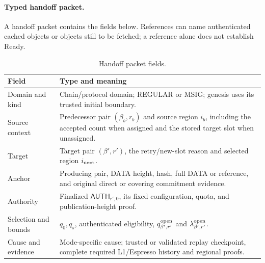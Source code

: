 \documentclass[11pt,a4paper]{article}
\newcommand{\tagg}[1]{\ensuremath{\mathsf{#1}}}
\newcounter{protocol}
\begin{document}
\paragraph{Typed handoff packet.}
A handoff packet contains the fields below. References can name
authenticated cached objects or objects still to be fetched; a reference
alone does not establish Ready.
\begin{table}[htbp]\centering\small
\caption{Handoff packet fields.}
\label{tab:handoff-packet}
\begin{tabularx}{\linewidth}{@{}>{\raggedright\arraybackslash}p{.26\linewidth}Y@{}}\toprule
Field & Type and meaning\\\midrule
Domain and kind & Chain/protocol domain; REGULAR or MSIG; genesis uses its trusted initial boundary.\\
Source context & Predecessor pair $(\beta_b,r_b)$ and source region
$i_b$, including the accepted count when assigned and the stored target
slot when unassigned.\\
Target & Target pair $(\beta',r')$, the retry/new-slot reason and selected
region $i_{\rm next}$.\\
Anchor & Producing pair, DATA height, hash, full DATA or reference,
and original direct or covering commitment evidence.\\
Authority & Finalized $\tagg{AUTH}_{r',0}$, its fixed configuration,
quota, and publication-height proof.\\
Selection and bounds & $q_0,q_s$, authenticated eligibility,
$q^{\rm open}_{\beta',r'}$ and $\lambda^{\rm open}_{\beta',r'}$.\\
Cause and evidence & Mode-specific cause; trusted or validated replay
checkpoint, complete required L1/Espresso history and regional proofs.\\\bottomrule
\end{tabularx}
\end{table}
\end{document}
